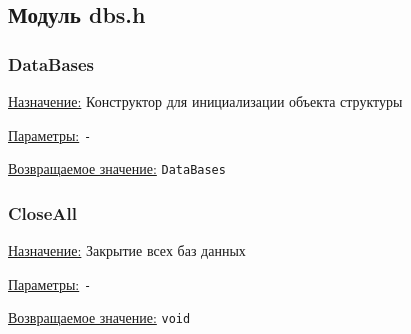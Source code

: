 \subsection{Модуль dbs.h}


\subsubsection{DataBases}

\underline{Назначение:} Конструктор для инициализации объекта структуры

\underline{Параметры:} \verb|-|

\underline{Возвращаемое значение:} \verb|DataBases|


\subsubsection{CloseAll}

\underline{Назначение:} Закрытие всех баз данных

\underline{Параметры:} \verb|-|

\underline{Возвращаемое значение:} \verb|void|

